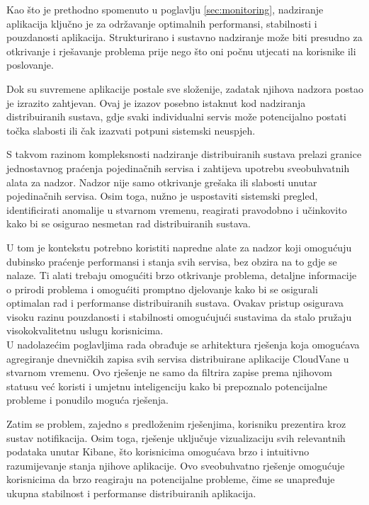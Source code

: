 \documentclass[times, utf8, diplomski]{fer}
\begin{document}
Kao što je prethodno spomenuto u poglavlju \ref{sec:monitoring}, nadziranje aplikacija ključno je za održavanje optimalnih performansi, stabilnosti i pouzdanosti aplikacija. Strukturirano i sustavno nadziranje može biti presudno za otkrivanje i rješavanje problema prije nego što oni počnu utjecati na korisnike ili poslovanje.

Dok su suvremene aplikacije postale sve složenije, zadatak njihova nadzora postao je izrazito zahtjevan. Ovaj je izazov posebno istaknut kod nadziranja distribuiranih sustava, gdje svaki individualni servis može potencijalno postati točka slabosti ili čak izazvati potpuni sistemski neuspjeh.

S takvom razinom kompleksnosti nadziranje distribuiranih sustava prelazi granice jednostavnog praćenja pojedinačnih servisa i zahtijeva upotrebu sveobuhvatnih alata za nadzor. Nadzor nije samo otkrivanje grešaka ili slabosti unutar pojedinačnih servisa. Osim toga, nužno je uspostaviti sistemski pregled, identificirati anomalije u stvarnom vremenu, reagirati pravodobno i učinkovito kako bi se osigurao nesmetan rad distribuiranih sustava.

U tom je kontekstu potrebno koristiti napredne alate za nadzor koji omogućuju dubinsko praćenje performansi i stanja svih servisa, bez obzira na to gdje se nalaze. Ti alati trebaju omogućiti brzo otkrivanje problema, detaljne informacije o prirodi problema i omogućiti promptno djelovanje kako bi se osigurali optimalan rad i performanse distribuiranih sustava. Ovakav pristup osigurava visoku razinu pouzdanosti i stabilnosti omogućujući sustavima da stalo pružaju visokokvalitetnu uslugu korisnicima.\\

U nadolazećim poglavljima rada obrađuje se arhitektura rješenja koja omogućava agregiranje dnevničkih zapisa svih servisa distribuirane aplikacije CloudVane u stvarnom vremenu. Ovo rješenje ne samo da filtrira zapise prema njihovom statusu već koristi i umjetnu inteligenciju kako bi prepoznalo potencijalne probleme i ponudilo moguća rješenja.

Zatim se problem, zajedno s predloženim rješenjima, korisniku prezentira kroz sustav notifikacija. Osim toga, rješenje uključuje vizualizaciju svih relevantnih podataka unutar Kibane, što korisnicima omogućava brzo i intuitivno razumijevanje stanja njihove aplikacije. Ovo sveobuhvatno rješenje omogućuje korisnicima da brzo reagiraju na potencijalne probleme, čime se unapređuje ukupna stabilnost i performanse distribuiranih aplikacija.
\end{document}
